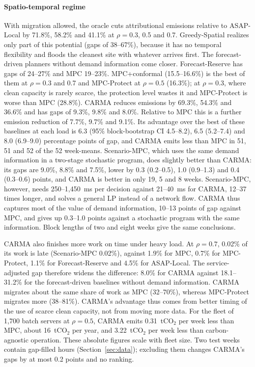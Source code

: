 \paragraph{Spatio-temporal regime} With migration allowed, the oracle cuts attributional emissions relative to ASAP-Local by 71.8\%, 58.2\% and 41.1\% at $\rho=0.3$, 0.5 and 0.7. Greedy-Spatial realizes only part of this potential (gaps of 38--67\%), because it has no temporal flexibility and floods the cleanest site with whatever arrives first. The forecast-driven planners without demand information come closer. Forecast-Reserve has gaps of 24--27\% and MPC 19--23\%. MPC+conformal (15.5--16.6\%) is the best of them at $\rho=0.3$ and 0.7 and MPC-Protect at $\rho=0.5$ (16.3\%); at $\rho=0.3$, where clean capacity is rarely scarce, the protection level wastes it and MPC-Protect is worse than MPC (28.8\%). CARMA reduces emissions by 69.3\%, 54.3\% and 36.6\% and has gaps of 9.3\%, 9.8\% and 8.0\%. Relative to MPC this is a further emission reduction of 7.7\%, 9.7\% and 9.1\%. Its advantage over the best of these baselines at each load is 6.3 (95\% block-bootstrap CI 4.5--8.2), 6.5 (5.2--7.4) and 8.0 (6.9--9.0) percentage points of gap, and CARMA emits less than MPC in 51, 51 and 52 of the 52 week-means. Scenario-MPC, which uses the same demand information in a two-stage stochastic program, does slightly better than CARMA: its gaps are 9.0\%, 8.8\% and 7.5\%, lower by 0.3 (0.2--0.5), 1.0 (0.9--1.3) and 0.4 (0.3--0.6) points, and CARMA is better in only 19, 5 and 8 weeks. Scenario-MPC, however, needs 250--1{,}450~ms per decision against 21--40~ms for CARMA, 12--37 times longer, and solves a general LP instead of a network flow. CARMA thus captures most of the value of demand information, 10--13 points of gap against MPC, and gives up 0.3--1.0 points against a stochastic program with the same information. Block lengths of two and eight weeks give the same conclusions.

CARMA also finishes more work on time under heavy load. At $\rho=0.7$, 0.02\% of its work is late (Scenario-MPC 0.02\%), against 1.9\% for MPC, 0.7\% for MPC-Protect, 1.1\% for Forecast-Reserve and 4.5\% for ASAP-Local. The service-adjusted gap therefore widens the difference: 8.0\% for CARMA against 18.1--31.2\% for the forecast-driven baselines without demand information. CARMA migrates about the same share of work as MPC (32--70\%), whereas MPC-Protect migrates more (38--81\%). CARMA's advantage thus comes from better timing of the use of scarce clean capacity, not from moving more data. For the fleet of 1{,}700 batch servers at $\rho=0.5$, CARMA emits 0.31~tCO$_2$ per week less than MPC, about 16~tCO$_2$ per year, and 3.22~tCO$_2$ per week less than carbon-agnostic operation. These absolute figures scale with fleet size. Two test weeks contain gap-filled hours (Section~\ref{sec:data}); excluding them changes CARMA's gaps by at most 0.2 points and no ranking.

